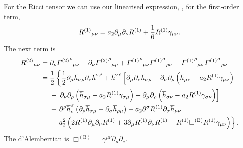 For the Ricci tensor we can use our linearised expression, , for the first-order term,
\begin{equation}
{R^{(1)}}_{\mu\nu} = a_2\partial_\mu\partial_\nu R^{(1)} + \frac{1}{6} R^{(1)}\gamma_{\mu\nu}.
\end{equation}
The next term is
\begin{align}
{R^{(2)}}_{\mu\nu} = {} & \partial_\rho {{\Gamma^{(2)}}^\rho}_{\mu\nu} - \partial_\nu {{\Gamma^{(2)}}^\rho}_{\mu\rho} + {{\Gamma^{(1)}}^\rho}_{\mu\nu}{{\Gamma^{(1)}}^\sigma}_{\rho\sigma} - {{\Gamma^{(1)}}^\rho}_{\mu\sigma}{{\Gamma^{(1)}}^\sigma}_{\rho\nu} \nonumber \\
 = {} & \frac{1}{2}\left\{\recip{2}\partial_\mu\overline{h}_{\sigma\rho}\partial_\nu\overline{h}^{\sigma\rho} + \overline{h}^{\sigma\rho}\left[\partial_\mu\partial_\nu\overline{h}_{\sigma\rho} \vphantom{R^{(1)}} + \partial_\sigma\partial_\rho\left(\overline{h}_{\mu\nu} - a_2 R^{(1)}\gamma_{\mu\nu}\right) \right.\right. \nonumber \\*
  & - \left.\left. \partial_\nu\partial_\rho\left(\overline{h}_{\sigma\mu} \vphantom{R^{(1)}} - a_2 R^{(1)} \gamma_{\sigma\mu}\right) - \partial_\mu\partial_\rho\left(\overline{h}_{\sigma\nu} - a_2 R^{(1)} \gamma_{\sigma\nu}\right)\right] \right. \nonumber \\*
  & + \left. \partial^\rho\overline{h}^\sigma_\nu\left(\partial_\rho\overline{h}_{\sigma\mu} - \partial_\sigma\overline{h}_{\rho\mu}\right) - a_2 \partial^\sigma R^{(1)}\partial_\sigma\overline{h}_{\mu\nu} \right. \nonumber \\*
  & + \left. a_2^2 \left(2R^{(1)}\partial_\mu\partial_\nu R^{(1)} + 3\partial_\mu R^{(1)}\partial_\nu R^{(1)} + R^{(1)} \Box^{(\text{B})} R^{(1)} \gamma_{\mu\nu}\right)\right\}.
\end{align}
The d'Alembertian is $\Box^{(\text{B})} = \gamma^{\mu\nu}\partial_\mu\partial_\nu$.

